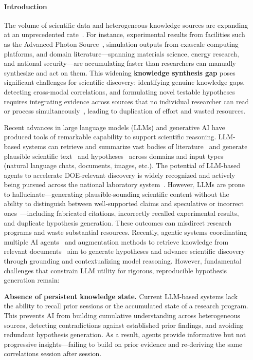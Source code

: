 \documentclass{files/proposalnsf}
\begin{document}
\paragraph*{Introduction}
The volume of scientific data and heterogeneous knowledge sources are expanding at an unprecedented rate~\cite{perabytes,steiner2023exponential}. For instance, experimental results from facilities such as the Advanced Photon Source~\cite{galayda1995advanced}, simulation outputs from exascale computing platforms, and domain literature---spanning materials science, energy research, and national security---are accumulating faster than researchers can manually synthesize and act on them. This widening \textbf{knowledge synthesis gap} poses significant challenges for scientific discovery: identifying genuine knowledge gaps, detecting cross-modal correlations, and formulating novel testable hypotheses requires integrating evidence across sources that no individual researcher can read or process simultaneously~\cite{zenodo1183562}, leading to duplication of effort and wasted resources.

Recent advances in large language models (LLMs) and generative AI have produced tools of remarkable capability to support scientific reasoning. LLM-based systems can retrieve and summarize vast bodies of literature~\cite{hsu2024chime} and generate plausible scientific text~\cite{huang2023role} and hypotheses~\cite{bazgir2025agentichypothesis} across domains and input types (\eg natural language chats, documents, images, etc.). The potential of LLM-based agents to accelerate DOE-relevant discovery is widely recognized and actively being pursued across the national laboratory system~\cite{rummler2026sandians}. However, LLMs are prone to hallucinate---generating plausible-sounding scientific content without the ability to distinguish between well-supported claims and speculative or incorrect ones~\cite{Ji2023HallucinationSurvey}---including fabricated citations, incorrectly recalled experimental results, and duplicate hypothesis generation. These outcomes can misdirect research programs and waste substantial resources. Recently, agentic systems coordinating multiple AI agents~\cite{saeedi2025astroagents} and augmentation methods to retrieve knowledge from relevant documents~\cite{} aim to generate hypotheses and advance scientific discovery through grounding and contextualizing model reasoning. However, fundamental challenges that constrain LLM utility for rigorous, reproducible hypothesis generation remain:

\textbf{Absence of persistent knowledge state.} Current LLM-based systems lack the ability to recall prior sessions or the accumulated state of a research program. This prevents AI from building cumulative understanding across heterogeneous sources, detecting contradictions against established prior findings, and avoiding redundant hypothesis generation. As a result, agents provide informative but not progressive insights---failing to build on prior evidence and re-deriving the same correlations session after session.
\end{document}
